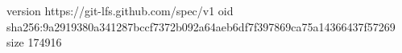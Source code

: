 version https://git-lfs.github.com/spec/v1
oid sha256:9a2919380a341287bccf7372b092a64aeb6df7f397869ca75a14366437f57269
size 174916
